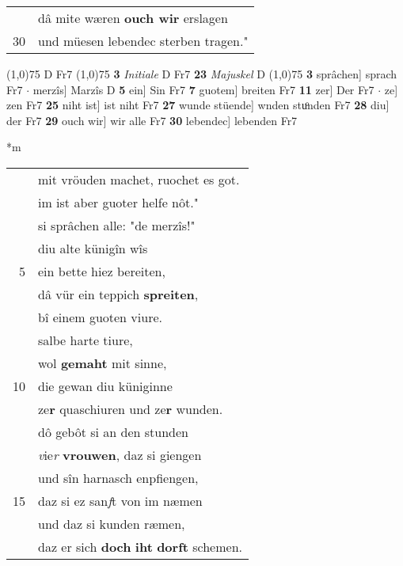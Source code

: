 \documentclass[8pt,a4paper,notitlepage]{article}
\begin{document}
\begin{table}[ht]
\begin{minipage}[t]{0.5\linewidth}
\begin{tabular}{rl}
 & dâ mite wæren \textbf{ouch wir} erslagen\\ 
30 & und müesen lebendec sterben tragen."\\ 
\end{tabular}
\scriptsize
\line(1,0){75} \newline
D Fr7 \newline
\line(1,0){75} \newline
\textbf{3} \textit{Initiale} D Fr7  \textbf{23} \textit{Majuskel} D  \newline
\line(1,0){75} \newline
\textbf{3} sprâchen] sprach Fr7  $\cdot$ merzîs] Marzîs D \textbf{5} ein] Sin Fr7 \textbf{7} guotem] breiten Fr7 \textbf{11} zer] Der Fr7  $\cdot$ ze] zen Fr7 \textbf{25} niht ist] ist niht Fr7 \textbf{27} wunde stüende] wnden stuͦnden Fr7 \textbf{28} diu] der Fr7 \textbf{29} ouch wir] wir alle Fr7 \textbf{30} lebendec] lebenden Fr7 \newline
\end{minipage}
\hspace{0.5cm}
\begin{minipage}[t]{0.5\linewidth}
\small
\begin{center}*m
\end{center}
\begin{tabular}{rl}
 & mit vröuden machet, ruochet es got.\\ 
 & im ist aber guoter helfe nôt."\\ 
 & si sprâchen alle: "de merzîs!"\\ 
 & diu alte künigîn wîs\\ 
5 & ein bette hiez bereiten,\\ 
 & dâ vür ein teppich \textbf{spreiten},\\ 
 & bî einem guoten viure.\\ 
 & salbe harte tiure,\\ 
 & wol \textbf{gemaht} mit sinne,\\ 
10 & die gewan diu küniginne\\ 
 & ze\textbf{r} quaschiuren und ze\textbf{r} wunden.\\ 
 & dô gebôt si an den stunden\\ 
 & \textit{v}ie\textit{r} \textbf{vrouwen}, daz si giengen\\ 
 & und sîn harnasch enpfiengen,\\ 
15 & daz si ez san\textit{f}t von im næmen\\ 
 & und daz si kunden ræmen,\\ 
 & daz er sich \textbf{doch} \textbf{iht} \textbf{dorft} schemen.\\ 

\end{tabular}
\end{minipage}
\end{table}
\end{document}
